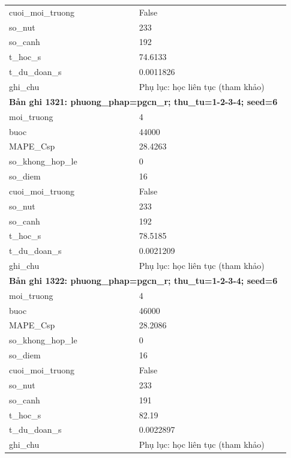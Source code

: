 \begin{longtable}{p{0.43\linewidth}p{0.50\linewidth}}
cuoi\_\allowbreak moi\_\allowbreak truong & False \\
so\_\allowbreak nut & 233 \\
so\_\allowbreak canh & 192 \\
t\_\allowbreak hoc\_\allowbreak s & 74.6133 \\
t\_\allowbreak du\_\allowbreak doan\_\allowbreak s & 0.0011826 \\
ghi\_\allowbreak chu & Phụ lục: học liên tục (tham khảo) \\
\midrule
\multicolumn{2}{p{0.95\linewidth}}{\textbf{Bản ghi 1321: phuong\_phap=pgcn\_r; thu\_tu=1-2-3-4; seed=6}} \\
moi\_\allowbreak truong & 4 \\
buoc & 44000 \\
MAPE\_\allowbreak Csp & 28.4263 \\
so\_\allowbreak khong\_\allowbreak hop\_\allowbreak le & 0 \\
so\_\allowbreak diem & 16 \\
cuoi\_\allowbreak moi\_\allowbreak truong & False \\
so\_\allowbreak nut & 233 \\
so\_\allowbreak canh & 192 \\
t\_\allowbreak hoc\_\allowbreak s & 78.5185 \\
t\_\allowbreak du\_\allowbreak doan\_\allowbreak s & 0.0021209 \\
ghi\_\allowbreak chu & Phụ lục: học liên tục (tham khảo) \\
\midrule
\multicolumn{2}{p{0.95\linewidth}}{\textbf{Bản ghi 1322: phuong\_phap=pgcn\_r; thu\_tu=1-2-3-4; seed=6}} \\
moi\_\allowbreak truong & 4 \\
buoc & 46000 \\
MAPE\_\allowbreak Csp & 28.2086 \\
so\_\allowbreak khong\_\allowbreak hop\_\allowbreak le & 0 \\
so\_\allowbreak diem & 16 \\
cuoi\_\allowbreak moi\_\allowbreak truong & False \\
so\_\allowbreak nut & 233 \\
so\_\allowbreak canh & 191 \\
t\_\allowbreak hoc\_\allowbreak s & 82.19 \\
t\_\allowbreak du\_\allowbreak doan\_\allowbreak s & 0.0022897 \\
ghi\_\allowbreak chu & Phụ lục: học liên tục (tham khảo) \\

\end{longtable}
